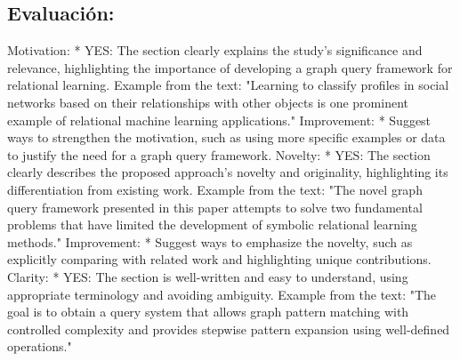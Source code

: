 \documentclass{article}%
\begin{document}
\subsection{Evaluación:}%
\label{subsec:Evaluacin}%
\newline%
Motivation:\newline%
\newline%
* YES: The section clearly explains the study's significance and relevance, highlighting the importance of developing a graph query framework for relational learning.\newline%
\newline%
Example from the text: "Learning to classify profiles in social networks based on their relationships with other objects is one prominent example of relational machine learning applications."\newline%
\newline%
Improvement:\newline%
\newline%
* Suggest ways to strengthen the motivation, such as using more specific examples or data to justify the need for a graph query framework.\newline%
\newline%
Novelty:\newline%
\newline%
* YES: The section clearly describes the proposed approach's novelty and originality, highlighting its differentiation from existing work.\newline%
\newline%
Example from the text: "The novel graph query framework presented in this paper attempts to solve two fundamental problems that have limited the development of symbolic relational learning methods."\newline%
\newline%
Improvement:\newline%
\newline%
* Suggest ways to emphasize the novelty, such as explicitly comparing with related work and highlighting unique contributions.\newline%
\newline%
Clarity:\newline%
\newline%
* YES: The section is well{-}written and easy to understand, using appropriate terminology and avoiding ambiguity.\newline%
\newline%
Example from the text: "The goal is to obtain a query system that allows graph pattern matching with controlled complexity and provides stepwise pattern expansion using well{-}defined operations."\newline%
\end{document}
